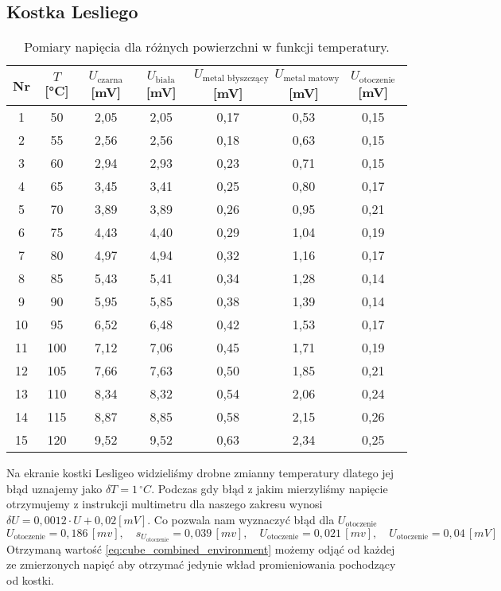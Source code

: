 \documentclass[12pt]{article}
\begin{document}
\subsection{Kostka Lesliego}
\begin{table}[H]
    \centering
    \begin{tabular}{c|c|cccc|c}
        \toprule
        Nr & $T$ [°C] & $U_\text{czarna}$ [mV] & $U_\text{biała}$ [mV] & $U_\text{metal błyszczący}$ [mV] & $U_\text{metal matowy}$ [mV] & $U_\text{otoczenie}$ [mV] \\
        \midrule
        1  & 50  & 2{,}05 & 2{,}05 & 0{,}17 & 0{,}53 & 0{,}15 \\
        2  & 55  & 2{,}56 & 2{,}56 & 0{,}18 & 0{,}63 & 0{,}15 \\
        3  & 60  & 2{,}94 & 2{,}93 & 0{,}23 & 0{,}71 & 0{,}15 \\
        4  & 65  & 3{,}45 & 3{,}41 & 0{,}25 & 0{,}80 & 0{,}17 \\
        5  & 70  & 3{,}89 & 3{,}89 & 0{,}26 & 0{,}95 & 0{,}21 \\
        6  & 75  & 4{,}43 & 4{,}40 & 0{,}29 & 1{,}04 & 0{,}19 \\
        7  & 80  & 4{,}97 & 4{,}94 & 0{,}32 & 1{,}16 & 0{,}17 \\
        8  & 85  & 5{,}43 & 5{,}41 & 0{,}34 & 1{,}28 & 0{,}14 \\
        9  & 90  & 5{,}95 & 5{,}85 & 0{,}38 & 1{,}39 & 0{,}14 \\
        10 & 95  & 6{,}52 & 6{,}48 & 0{,}42 & 1{,}53 & 0{,}17 \\
        11 & 100 & 7{,}12 & 7{,}06 & 0{,}45 & 1{,}71 & 0{,}19 \\
        12 & 105 & 7{,}66 & 7{,}63 & 0{,}50 & 1{,}85 & 0{,}21 \\
        13 & 110 & 8{,}34 & 8{,}32 & 0{,}54 & 2{,}06 & 0{,}24 \\
        14 & 115 & 8{,}87 & 8{,}85 & 0{,}58 & 2{,}15 & 0{,}26 \\
        15 & 120 & 9{,}52 & 9{,}52 & 0{,}63 & 2{,}34 & 0{,}25 \\
        \bottomrule
    \end{tabular}
    \caption{Pomiary napięcia dla różnych powierzchni w funkcji temperatury.}
    \label{tab:cube_measurements}
\end{table}
Na ekranie kostki Lesligeo widzieliśmy drobne zmianny temperatury dlatego jej błąd uznajemy jako $\delta T = 1 \, ^{\circ}C$.
Podczas gdy błąd z jakim mierzyliśmy napięcie otrzymujemy z instrukcji multimetru \cite{radiation_multimeter} dla naszego zakresu wynosi $\delta U = 0{,}0012 \cdot U + 0{,}02 [mV]$.
Co pozwala nam wyznaczyć błąd dla $U_\text{otoczenie}$
\begin{equation}
    U_\text{otoczenie} = 0{,}186 \, [mv], \quad s_{U_\text{otoczenie}} = 0{,}039 \, [mv], \quad U_\text{otoczenie} = 0{,}021 \, [mv], \quad U_\text{otoczenie} = 0{,}04 \, [mV]
    \label{eq:cube_combined_environment}
\end{equation}
Otrzymaną wartość \eqref{eq:cube_combined_environment} możemy odjąć od każdej ze zmierzonych napięć aby otrzymać jedynie wkład promieniowania pochodzący od kostki.
\end{document}
